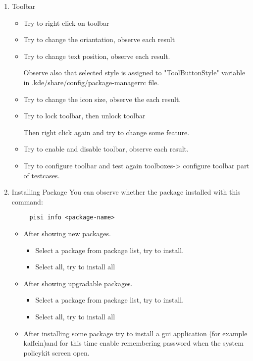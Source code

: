 \documentclass[a4paper,10pt]{article}
\begin{document}
\begin{enumerate}
    \item Toolbar
    \begin{itemize}
        \item Try to right click on toolbar
        \item Try to change the oriantation, observe each result
        \item Try to change text position, observe each result.
    
            Observe also that selected style is assigned to "ToolButtonStyle" variable in .kde/share/config/package-managerrc file.
        \item Try to change the icon size, observe the each result.
        \item Try to lock toolbar, then unlock toolbar
    
            Then right click again and try to change some feature.
        \item Try to enable and disable toolbar, observe each result.
        \item Try to configure toolbar and test again toolboxes-> configure toolbar part of testcases.
    \end{itemize}
    \item Installing Package
	You can observe whether the package installed with this command:
	\begin{verbatim}
	 pisi info <package-name>
	\end{verbatim}

        \begin{itemize}
            \item After showing new packages. 
            \begin{itemize}
                \item Select a package from package list, try to install.
                \item Select all, try to install all
            \end{itemize}
            \item After showing upgradable packages.
            \begin{itemize}
                \item Select a package from package list, try to install.
                \item Select all, try to install all
            \end{itemize}
	\item After installing some package try to install a gui application (for example kaffein)and for this time enable remembering password when the system policykit screen open.
		

\end{itemize}
\end{enumerate}
\end{document}
